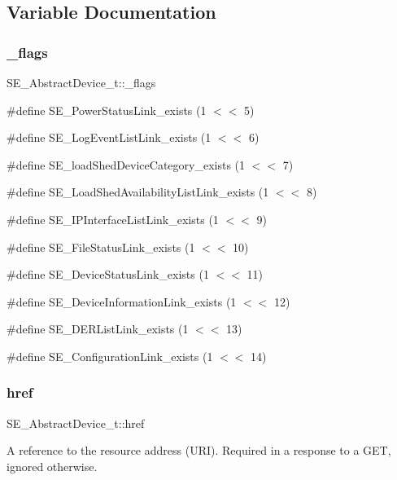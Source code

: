 \subsection{Variable Documentation}
\mbox{\label{group__AbstractDevice_gaebf23551088374995ff737d4849f46b7}} 
\subsubsection{\texorpdfstring{\+\_\+flags}{\_flags}}
{\footnotesize\ttfamily S\+E\+\_\+\+Abstract\+Device\+\_\+t\+::\+\_\+flags}

\#define S\+E\+\_\+\+Power\+Status\+Link\+\_\+exists (1 $<$$<$ 5)

\#define S\+E\+\_\+\+Log\+Event\+List\+Link\+\_\+exists (1 $<$$<$ 6)

\#define S\+E\+\_\+load\+Shed\+Device\+Category\+\_\+exists (1 $<$$<$ 7)

\#define S\+E\+\_\+\+Load\+Shed\+Availability\+List\+Link\+\_\+exists (1 $<$$<$ 8)

\#define S\+E\+\_\+\+I\+P\+Interface\+List\+Link\+\_\+exists (1 $<$$<$ 9)

\#define S\+E\+\_\+\+File\+Status\+Link\+\_\+exists (1 $<$$<$ 10)

\#define S\+E\+\_\+\+Device\+Status\+Link\+\_\+exists (1 $<$$<$ 11)

\#define S\+E\+\_\+\+Device\+Information\+Link\+\_\+exists (1 $<$$<$ 12)

\#define S\+E\+\_\+\+D\+E\+R\+List\+Link\+\_\+exists (1 $<$$<$ 13)

\#define S\+E\+\_\+\+Configuration\+Link\+\_\+exists (1 $<$$<$ 14) \mbox{\label{group__AbstractDevice_gaadb55d913e28d17f3600e87dea61959e}} 
\subsubsection{\texorpdfstring{href}{href}}
{\footnotesize\ttfamily S\+E\+\_\+\+Abstract\+Device\+\_\+t\+::href}

A reference to the resource address (U\+RI). Required in a response to a G\+ET, ignored otherwise. \mbox{\label{group__AbstractDevice_ga96f19b4ecd35a06cd9cdce0c1a78a340}} 
